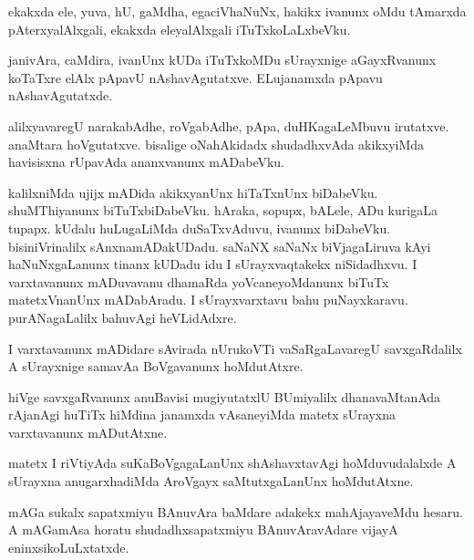 \documentclass{article}
\begin{document}
\begin{mng}%
ekakxda ele, yuva, hU, gaMdha, egaciVhaNuNx, hakikx ivanunx oMdu tAmarxda pAterxyalAlxgali, 
ekakxda eleyalAlxgali iTuTxkoLaLxbeVku.
\end{mng}

\begin{mng}%
janivAra, caMdira, ivanUnx kUDa iTuTxkoMDu sUrayxnige aGayxRvanunx koTaTxre elAlx pApavU 
nAshavAgutatxve. ELujanamxda pApavu nAshavAgutatxde.
\end{mng}

\begin{mng}%
alilxyavaregU narakabAdhe, roVgabAdhe, pApa, duHKagaLeMbuvu irutatxve. anaMtara hoVgutatxve. 
bisalige oNahAkidadx shudadhxvAda akikxyiMda havisisxna rUpavAda ananxvanunx mADabeVku.
\end{mng}

\begin{mng}%
kalilxniMda ujijx mADida akikxyanUnx hiTaTxnUnx biDabeVku. shuMThiyanunx biTuTxbiDabeVku. hAraka, 
sopupx, bALele, ADu kurigaLa tupapx. kUdalu huLugaLiMda duSaTxvAduvu, ivanunx biDabeVku. 
bisiniVrinalilx sAnxnamADakUDadu. saNaNX saNaNx biVjagaLiruva kAyi haNuNxgaLanunx tinanx kUDadu 
idu I sUrayxvaqtakekx niSidadhxvu. I varxtavanunx mADuvavanu dhamaRda yoVcaneyoMdanunx biTuTx 
matetxVnanUnx mADabAradu. I sUrayxvarxtavu bahu puNayxkaravu. purANagaLalilx bahuvAgi heVLidAdxre.
\end{mng}

\begin{mng}%
I varxtavanunx mADidare sAvirada nUrukoVTi vaSaRgaLavaregU savxgaRdalilx A sUrayxnige samavAa 
BoVgavanunx hoMdutAtxre.
\end{mng}

\begin{mng}%
hiVge savxgaRvanunx anuBavisi mugiyutatxlU BUmiyalilx dhanavaMtanAda rAjanAgi huTiTx hiMdina 
janamxda vAsaneyiMda matetx sUrayxna varxtavanunx mADutAtxne.
\end{mng}

\begin{mng}%
matetx I riVtiyAda suKaBoVgagaLanUnx shAshavxtavAgi hoMduvudalalxde A sUrayxna anugarxhadiMda 
AroVgayx saMtutxgaLanUnx hoMdutAtxne.
\end{mng}

\begin{mng}%
mAGa sukalx sapatxmiyu BAnuvAra baMdare adakekx mahAjayaveMdu hesaru. A mAGamAsa horatu 
shudadhxsapatxmiyu BAnuvAravAdare vijayA eninxsikoLuLxtatxde.
\end{mng}
\end{document}
